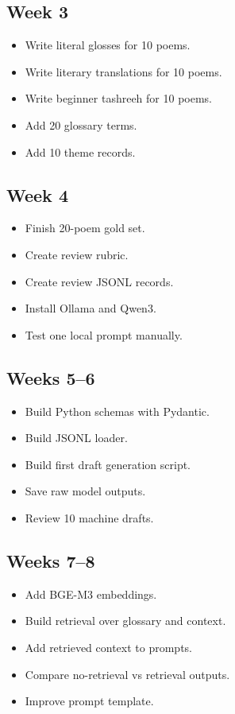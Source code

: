 \documentclass[11pt]{article}
\begin{document}
\subsection{Week 3}

\begin{itemize}
  \item Write literal glosses for 10 poems.
  \item Write literary translations for 10 poems.
  \item Write beginner tashreeh for 10 poems.
  \item Add 20 glossary terms.
  \item Add 10 theme records.
\end{itemize}

\subsection{Week 4}

\begin{itemize}
  \item Finish 20-poem gold set.
  \item Create review rubric.
  \item Create review JSONL records.
  \item Install Ollama and Qwen3.
  \item Test one local prompt manually.
\end{itemize}

\subsection{Weeks 5--6}

\begin{itemize}
  \item Build Python schemas with Pydantic.
  \item Build JSONL loader.
  \item Build first draft generation script.
  \item Save raw model outputs.
  \item Review 10 machine drafts.
\end{itemize}

\subsection{Weeks 7--8}

\begin{itemize}
  \item Add BGE-M3 embeddings.
  \item Build retrieval over glossary and context.
  \item Add retrieved context to prompts.
  \item Compare no-retrieval vs retrieval outputs.
  \item Improve prompt template.
\end{itemize}
\end{document}
